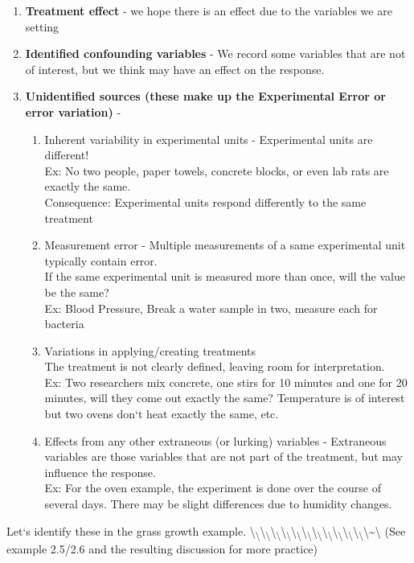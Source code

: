 \documentclass[]{book}
\begin{document}
\begin{enumerate}
\item \textbf{Treatment effect} - we hope there is an effect due to the variables we are setting
\item \textbf{Identified confounding variables} - We record some variables that are not of interest, but we think may have an effect on the response.
\item \textbf{Unidentified sources (these make up the Experimental Error or error variation)} -
        \begin{enumerate}
            \item Inherent variability in experimental units - Experimental units are different! \\
        Ex: No two people, paper towels, concrete blocks, or even lab rats are exactly the same.\\
        Consequence: Experimental units respond differently to the same treatment
            \item Measurement error - Multiple measurements of a same experimental unit typically contain error.\\
            If the same experimental unit is measured more than once, will the value be the same?\\
            Ex: Blood Pressure, Break a water sample in two, measure each for bacteria
            \item Variations in applying/creating treatments\\
        The treatment is not clearly defined, leaving room for interpretation.  \\
            Ex:  Two researchers mix concrete, one stirs for 10 minutes and one for 20 minutes, will they come out exactly the same? Temperature is of interest but two ovens don`t heat exactly the same, etc.
            \item Effects from any other extraneous (or lurking) variables - Extraneous variables are those variables that are not part of the treatment, but may influence the response.\\
            Ex: For the oven example, the experiment is done over the course of several days.  There may be slight differences due to humidity changes.
        \end{enumerate}
\end{enumerate}

Let`s identify these in the grass growth example.
\textbackslash{}\textsubscript{\textbackslash{}}\textbackslash{}\textsubscript{\textbackslash{}}\textbackslash{}\textsubscript{\textbackslash{}}\textbackslash{}\textsubscript{\textbackslash{}}\textbackslash{}\textsubscript{\textbackslash{}}\textbackslash{}\textsubscript{\textbackslash{}}\textbackslash{}\textsubscript{\textbackslash{}}\textbackslash{}\textsubscript{\textbackslash{}}\textbackslash{}\textsubscript{\textbackslash{}}\textbackslash{}\textsubscript{\textbackslash{}}\textbackslash{}\textsubscript{\textbackslash{}}\textbackslash{}\textasciitilde{}\textbackslash{}
(See example 2.5/2.6 and the resulting discussion for more practice)
\end{document}
